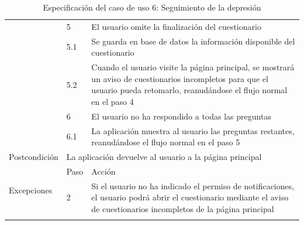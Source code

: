 \begin{table}[h]
\begin{tabularx}{\textwidth}{|l|l|X|}
            \cline{2-3} & 5 & El usuario omite la finalización del cuestionario \\
            \cline{2-3} & 5.1 & Se guarda en base de datos la información disponible del cuestionario \\
            \cline{2-3} & 5.2 & Cuando el usuario visite la página principal, se mostrará un aviso de cuestionarios incompletos para que el usuario pueda retomarlo, reanudándose el flujo normal en el paso 4 \\
            \cline{2-3} & 6 & El usuario no ha respondido a todas las preguntas \\
            \cline{2-3} & 6.1 & La aplicación muestra al usuario las preguntas restantes, reanudándose el flujo normal en el paso 5 \\
            \hline
            Postcondición & \multicolumn{2}{|X|}{La aplicación devuelve al usuario a la página principal} \\
            \hline
            \multirow{2}{*}{Excepciones}  & Paso & Acción \\
            \cline{2-3} & 2 & Si el usuario no ha indicado el permiso de notificaciones, el usuario podrá abrir el cuestionario mediante el aviso de cuestionarios incompletos de la página principal \\
            \hline
            \caption{Especificación del caso de uso 6: Seguimiento de la depresión}
            \label{tabla:casos_uso:seguimiento_depresion}
        \end{tabularx}
    \end{table}

